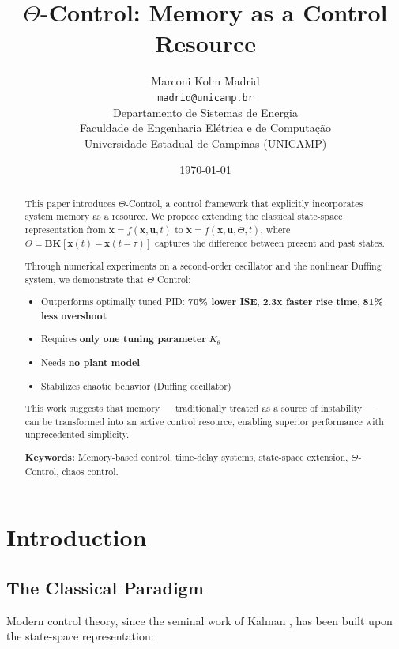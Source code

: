 \documentclass[12pt,a4paper]{article}
\title{$\Theta$-Control: Memory as a Control Resource}
\author{
\parbox{0.9\textwidth}{
\centering
Marconi Kolm Madrid\\
\texttt{madrid@unicamp.br}\\
[0.5em]
Departamento de Sistemas de Energia\\
Faculdade de Engenharia Elétrica e de Computação\\
Universidade Estadual de Campinas (UNICAMP)
}
}
\date{\today}
\begin{document}
\maketitle

\begin{abstract}
This paper introduces $\Theta$-Control, a control framework that 
explicitly incorporates system memory as a resource. We propose 
extending the classical state-space representation from 
$\dot{\mathbf{x}} = f(\mathbf{x},\mathbf{u},t)$ to 
$\dot{\mathbf{x}} = f(\mathbf{x},\mathbf{u},\Theta,t)$, where 
$\Theta = \mathbf{BK}[\mathbf{x}(t) - \mathbf{x}(t-\tau)]$ captures 
the difference between present and past states.

Through numerical experiments on a second-order oscillator and the 
nonlinear Duffing system, we demonstrate that $\Theta$-Control:

\begin{itemize}
    \item Outperforms optimally tuned PID: \textbf{70\% lower ISE}, 
          \textbf{2.3x faster rise time}, \textbf{81\% less overshoot}
    \item Requires \textbf{only one tuning parameter} $K_\theta$
    \item Needs \textbf{no plant model}
    \item Stabilizes chaotic behavior (Duffing oscillator)
\end{itemize}

This work suggests that memory — traditionally treated as a 
source of instability — can be transformed into an active 
control resource, enabling superior performance with 
unprecedented simplicity.

\noindent\textbf{Keywords:} Memory-based control, time-delay 
systems, state-space extension, $\Theta$-Control, chaos control.
\end{abstract}

\section{Introduction}

\subsection{The Classical Paradigm}

Modern control theory, since the seminal work of Kalman 
\citep{Kalman1960}, has been built upon the state-space 
representation:
\end{document}
